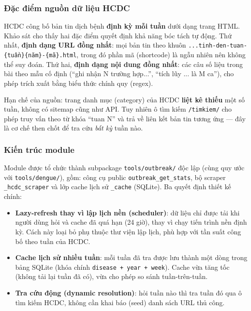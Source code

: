 \documentclass[a4paper,13pt,3p,oneside]{report}
\theoremstyle{definition}
\theoremstyle{remark}
\theoremstyle{definition}
\begin{document}
\subsubsection{Đặc điểm nguồn dữ liệu HCDC}

HCDC công bố bản tin dịch bệnh \textbf{định kỳ mỗi tuần} dưới dạng trang HTML. Khảo sát cho thấy hai đặc điểm quyết định khả năng bóc tách tự động. Thứ nhất, \textbf{định dạng URL đồng nhất}: mọi bản tin theo khuôn \texttt{...tinh-den-tuan-\{tuần\}\{năm\}-\{mã\}.html}, trong đó phần mã (shortcode) là ngẫu nhiên nên không thể suy đoán. Thứ hai, \textbf{định dạng nội dung đồng nhất}: các câu số liệu trong bài theo mẫu cố định (``ghi nhận N trường hợp...'', ``tích lũy ... là M ca''), cho phép trích xuất bằng biểu thức chính quy (regex).

Hạn chế của nguồn: trang danh mục (category) của HCDC \textbf{liệt kê thiếu} một số tuần, không có sitemap cũng như API. Tuy nhiên ô tìm kiếm \texttt{/timkiem/} cho phép truy vấn theo từ khóa ``tuan N'' và trả về liên kết bản tin tương ứng --- đây là cơ chế then chốt để tra cứu \textit{bất kỳ} tuần nào.

\subsubsection{Kiến trúc module}

Module được tổ chức thành subpackage \texttt{tools/outbreak/} độc lập (cùng quy ước với \texttt{tools/dengue/}), gồm: công cụ public \texttt{outbreak\_get\_stats}, bộ scraper \texttt{\_hcdc\_scraper} và lớp cache lịch sử \texttt{\_cache} (SQLite). Ba quyết định thiết kế chính:

\begin{itemize}
  \item \textbf{Lazy-refresh thay vì lập lịch nền (scheduler)}: dữ liệu chỉ được tải khi người dùng hỏi và cache đã quá hạn (24 giờ), thay vì chạy tiến trình nền định kỳ. Cách này loại bỏ phụ thuộc thư viện lập lịch, phù hợp với tần suất công bố theo tuần của HCDC.
  \item \textbf{Cache lịch sử nhiều tuần}: mỗi tuần đã tra được lưu thành một dòng trong bảng SQLite (khóa chính \texttt{disease + year + week}). Cache vừa tăng tốc (không tải lại tuần đã có), vừa cho phép so sánh tuần-trên-tuần.
  \item \textbf{Tra cứu động (dynamic resolution)}: hỏi tuần nào thì tra tuần đó qua ô tìm kiếm HCDC, không cần khai báo (seed) danh sách URL thủ công.
\end{itemize}
\end{document}
